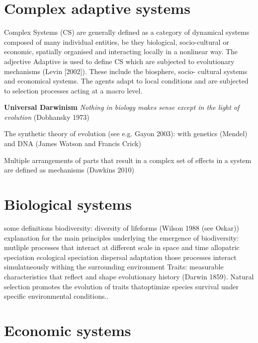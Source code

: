 \section{Complex adaptive systems}
\label{sec:intro:cas}
\begin{outline}
    \1 Complex Systems (CS) are generally defined as a category of dynamical systems composed of many individual entities, be they biological, socio-cultural or economic, spatially organised and interacting locally in a nonlinear way. The adjective Adaptive is used to define CS which are subjected to evolutionary mechanisms (Levin [2002]). These include the biosphere, socio- cultural systems and economical systems. The agents adapt to local conditions and are subjected to selection processes acting at a macro level.

    \1 \textbf{Universal Darwinism} \textit{Nothing in biology makes sense except in the light of evolution} (Dobhansky 1973)
    
    \1 The synthetic  theory of evolution (see e.g. Gayon 2003): with genetics (Mendel) and DNA (James Watson and Francis Crick)

    \1 Multiple arrangements of parts that result in a complex set of effects in a system are defined as mechanisms (Dawkins 2010)
\end{outline}


\section{Biological systems}
\begin{outline}
    \1 some definitions
        \2 biodiversity: diversity of lifeforms (Wilson 1988 (see Oskar))
    \1 explanation for the main principles underlying the emergence of biodiversity: mutliple processes that interact at different scale in space and time 
        \2 allopatric speciation
        \2 ecological speciation 
        \2 dispersal
        \2 adaptation
        \2 those processes interact simulatneously withing the surrounding environment
    \1 Traits: measurable characteristics that reflect and shape evolutionary history (Darwin 1859). Natural selection promotes the evolution of traits thatoptimize species survival under specific environmental conditions..

\end{outline}

\section{Economic systems}

